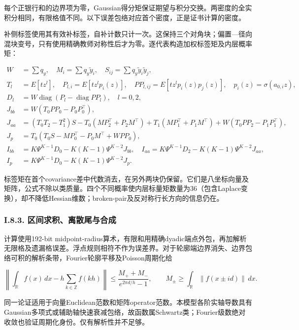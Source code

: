 \documentclass[11pt,a4paper]{article}
\begin{document}
每个正银行和的边界项为零，Gaussian得分矩保证期望与积分交换。两密度的全实积分相同，有限格值不同。以下误差包络对应首个密度，正是证书计算的密度。

补侧标签使用其有效补标签，自补计数只计一次。这保持三个对角块；偏置---径向混块变号，只有使用精确教师对称性后才为零。逐代表构造加权标签矩及内层概率矩：

\[
\begin{aligned}
W&=\sum q_y,\quad M_i=\sum q_y\widetilde y_i,\quad S_{ij}=\sum q_y\widetilde y_i\widetilde y_j,\\
T_l&=E[tz^l],\quad P_{l,i}=E[tz^lp_i(z)],\quad PP_{l,ij}=E[tz^lp_i(z)p_j(z)],\quad p_i(z)=\sigma(a_{0,i}z),\\
D_l&=W\operatorname{diag}(P_l-\operatorname{diag}PP_l),\quad l=0,2,\\
J_{bb}&=W(T_0PP_0-P_0P_0^\top),\\
J_{aa}&=(T_0T_2-T_1^2)S-T_0(MP_2^\top+P_2M^\top)
+T_1(MP_1^\top+P_1M^\top)+W(T_0PP_2-P_1P_1^\top),\\
J_p&=T_0(T_0S-MP_0^\top-P_0M^\top+WPP_0),\\
I_{bb}&=K\Psi^{K-1}D_0-K(K-1)\Psi^{K-2}J_{bb},\quad
I_{aa}=K\Psi^{K-1}D_2-K(K-1)\Psi^{K-2}J_{aa},\\
I_p&=K\Psi^{K-1}D_0-K(K-1)\Psi^{K-2}J_p.
\end{aligned}
\tag{I.26}
\]

标签矩在首个covariance差中代数消去，在另外两块仍保留。它们是八坐标向量及矩阵，公式不除以类质量。四个不同概率使内层标量矩数量为36（包含Laplace变换），却不降低Hessian维数；broken-pair及反对称行长方向的信息仍在。

\subsubsection*{I.8.3.
区间求积、离散尾与合成}\label{i.8.3.-ux533aux95f4ux6c42ux79efux79bbux6563ux5c3eux4e0eux5408ux6210}

计算使用192-bit
midpoint-radius算术\citep{johansson2017}，有限和用精确dyadic端点外包，再加解析无限格及遗漏格误差。浮点规则相符不作为误差界。对于轮廓端边界消失、边界包络可积的解析条带，Fourier轮廓平移及Poisson周期化给\citep{trefethen2014}

\[
\left\|\int_{\mathbb R}f(x)\,dx-h\sum_{k\in\mathbb Z}f(kh)\right\|
\le\frac{M_++M_-}{e^{2\pi d/h}-1},\qquad
M_\pm\ge\int_{\mathbb R}\|f(x\pm id)\|\,dx.
\tag{I.27}
\]

同一论证适用于向量Euclidean范数和矩阵operator范数。本模型各阶实轴导数具有Gaussian多项式或辅助轴快速衰减包络，故函数属Schwartz类；Fourier级数绝对收敛也验证周期化身份。仅有解析性并不足够。
\end{document}
